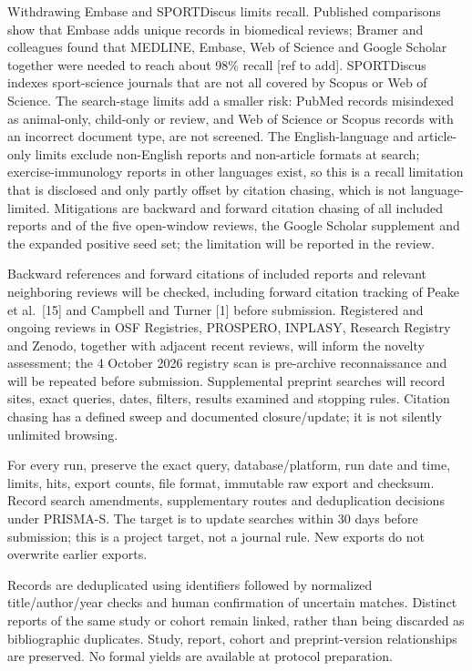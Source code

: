 \documentclass[
  11pt,
  a4paper,
]{article}
\begin{document}
Withdrawing Embase and SPORTDiscus limits recall. Published comparisons
show that Embase adds unique records in biomedical reviews; Bramer and
colleagues found that MEDLINE, Embase, Web of Science and Google Scholar
together were needed to reach about 98\% recall {[}ref to add{]}.
SPORTDiscus indexes sport-science journals that are not all covered by
Scopus or Web of Science. The search-stage limits add a smaller risk:
PubMed records misindexed as animal-only, child-only or review, and Web
of Science or Scopus records with an incorrect document type, are not
screened. The English-language and article-only limits exclude
non-English reports and non-article formats at search;
exercise-immunology reports in other languages exist, so this is a
recall limitation that is disclosed and only partly offset by citation
chasing, which is not language-limited. Mitigations are backward and
forward citation chasing of all included reports and of the five
open-window reviews, the Google Scholar supplement and the expanded
positive seed set; the limitation will be reported in the review.

Backward references and forward citations of included reports and
relevant neighboring reviews will be checked, including forward citation
tracking of Peake et al.~{[}15{]} and Campbell and Turner {[}1{]} before
submission. Registered and ongoing reviews in OSF Registries, PROSPERO,
INPLASY, Research Registry and Zenodo, together with adjacent recent
reviews, will inform the novelty assessment; the 4 October 2026 registry
scan is pre-archive reconnaissance and will be repeated before
submission. Supplemental preprint searches will record sites, exact
queries, dates, filters, results examined and stopping rules. Citation
chasing has a defined sweep and documented closure/update; it is not
silently unlimited browsing.

For every run, preserve the exact query, database/platform, run date and
time, limits, hits, export counts, file format, immutable raw export and
checksum. Record search amendments, supplementary routes and
deduplication decisions under PRISMA-S. The target is to update searches
within 30 days before submission; this is a project target, not a
journal rule. New exports do not overwrite earlier exports.

Records are deduplicated using identifiers followed by normalized
title/author/year checks and human confirmation of uncertain matches.
Distinct reports of the same study or cohort remain linked, rather than
being discarded as bibliographic duplicates. Study, report, cohort and
preprint-version relationships are preserved. No formal yields are
available at protocol preparation.
\end{document}
